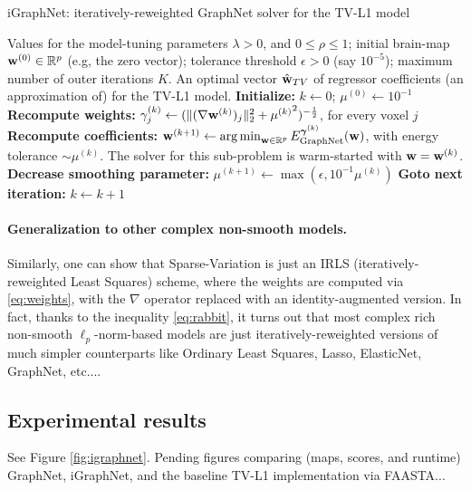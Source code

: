 \begin{algorithm}
\caption{iGraphNet: iteratively-reweighted GraphNet solver for the
  TV-L1 model}
\label{Tab:algo}
\begin{algorithmic}[1]
\Require Values for the model-tuning parameters
  $\lambda > 0$, and $0 \le \rho \le 1$; initial brain-map $\mathbf{w}^{(0)}
  \in \mathbb R^p$ (e.g, the zero vector); tolerance threshold
  $\epsilon > 0$ (say $10^{-5}$); maximum number of outer iterations
  $K$.
\Ensure An optimal vector $\hat{\mathbf{w}}_{TV}$ of regressor coefficients (an approximation of)
for the TV-L1 model.
\State  \textbf{Initialize:} $k \leftarrow 0$; $\mu^{(0)} \leftarrow 10^{-1}$
\State \textbf{Recompute weights:} $\gamma_j^{(k)} \leftarrow (\|(\nabla
\mathbf{w}^{(k)})_j\|_2^2 + {\mu^{(k)}}^2)^{-\frac{1}{2}}$, for every voxel $j$
\State  \textbf{Recompute coefficients:} $\mathbf{w}^{(k + 1)}
  \leftarrow \operatorname*{arg\,min}_{\mathbf{w} \in \mathbb R^p}
  E_{\text{GraphNet}}^{\boldsymbol{\gamma}^{(k)}}(\mathbf{w})$, with energy
  tolerance $\sim \mu^{(k)}$. The solver for this sub-problem
  is warm-started with $\mathbf{w} = \mathbf{w}^{(k)}$.
\State \textbf{Decrease smoothing parameter:} $\mu^{(k + 1)}
\leftarrow \max(\epsilon, 10^{-1}\mu^{(k)})$
\State \textbf{Goto next iteration:} $k \leftarrow k + 1$
\EndWhile
\end{algorithmic}
\end{algorithm}

\paragraph*{Generalization to other complex non-smooth models.}
Similarly, one can show that Sparse-Variation
\citep{eickenberg2015total} is just an IRLS
(iteratively-reweighted Least Squares) scheme, where the weights are
computed via \eqref{eq:weights}, with the $\nabla$ operator replaced
with an identity-augmented version. In fact, thanks to the inequality
\eqref{eq:rabbit}, it turns out that most
complex rich non-smooth $\ell_p$-norm-based models are just
iteratively-reweighted versions of much simpler counterparts like
Ordinary Least Squares, Lasso, ElasticNet, GraphNet, etc....

\subsection{Experimental results}
See Figure \ref{fig:igraphnet}. Pending figures comparing (maps, scores, and
runtime) GraphNet, iGraphNet, and the baseline TV-L1 implementation via FAASTA...

